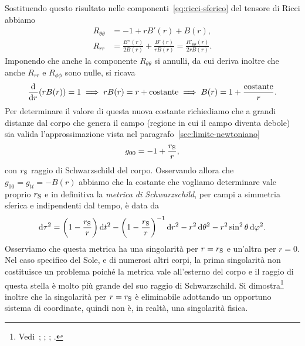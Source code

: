 Sostituendo questo risultato nelle componenti~\eqref{eq:ricci-sferico} del
tensore di Ricci abbiamo
\begin{subequations}
  \begin{align}
    R_{\theta\theta} &= -1 + rB'(r) + B(r), \\
    R_{rr} &= \frac{B''(r)}{2B(r)} + \frac{B'(r)}{rB(r)} =
    \frac{R'_{\theta\theta}(r)}{2rB(r)}.
  \end{align}
\end{subequations}
Imponendo che anche la componente $R_{\theta\theta}$ si annulli, da cui deriva
inoltre che anche $R_{rr}$ e $R_{\phi\phi}$ sono nulle, si ricava
\begin{equation}
  \frac{{\mathop{}\!\mathrm{d}^{}}}{\mathop{}\!\mathrm{d} {r}^{}}(rB(r)) = 1 \implies rB(r) = r + \text{costante} \implies B(r) = 1
  + \frac{\text{costante}}{r}.
\end{equation}
Per determinare il valore di questa nuova costante richiediamo che a grandi
distanze dal corpo che genera il campo (regione in cui il campo diventa debole)
sia valida l'approssimazione vista nel paragrafo~\ref{sec:limite-newtoniano}
\begin{equation}
  g_{00} = -1 + \frac{r_{\textup{S}}}{r},
\end{equation}
con $r_{\textup{S}}$ raggio di Schwarzschild del corpo.  Osservando allora che
$g_{00} = g_{tt} = -B(r)$ abbiamo che la costante che vogliamo determinare vale
proprio $r_{\textup{S}}$ e in definitiva la
\emph{metrica di Schwarzschild}, per campi a
simmetria sferica e indipendenti dal tempo, è data da
\begin{equation}
  \label{eq:metrica-schwarzschild}
  \mathop{}\!\mathrm{d}\tau^{2} = \bigg(1 - \frac{r_{\textup{S}}}{r} \bigg) \mathop{}\!\mathrm{d} t^{2} - \bigg(1 -
  \frac{r_{\textup{S}}}{r}\bigg)^{-1}\mathop{}\!\mathrm{d} r^{2} - r^{2}\mathop{}\!\mathrm{d}\theta^{2} -
  r^{2}\sin^{2}\theta \mathop{}\!\mathrm{d}\varphi^{2}.
\end{equation}
Osserviamo che questa metrica ha una singolarità per $r = r_{\textup{S}}$ e
un'altra per $r = 0$.  Nel caso specifico del Sole, e di numerosi altri corpi,
la prima singolarità non costituisce un problema poiché la metrica vale
all'esterno del corpo e il raggio di questa stella è molto più grande del suo
raggio di Schwarzschild.  Si
dimostra\footnote{Vedi~\textcite[511]{barone:relativita};
  \textcite[403-404]{landau:campi}; \textcite[374-378]{ohanian:gravitazione};
  \textcite[207-208]{weinberg:gravitation}.}  inoltre che la singolarità per $r
= r_{\textup{S}}$ è eliminabile adottando un opportuno sistema di coordinate,
quindi non è, in realtà, una singolarità fisica.

